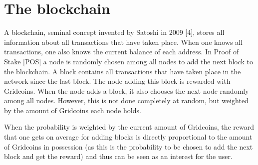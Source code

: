 \section{The blockchain}

A blockchain, seminal concept invented by Satoshi in 2009 [4], stores all information about all transactions that have taken place. When one knows all transactions, one also knows the current balance of each address. In Proof of Stake [POS] a node is randomly chosen among all nodes to add the next block to the blockchain. A block contains all transactions that have taken place in the network since the last block. The node adding this block is rewarded with Gridcoins. When the node adds a block, it also chooses the next node randomly among all nodes. However, this is not done completely at random, but weighted by the amount of Gridcoins each node holds.

When the probability is weighted by the current amount of Gridcoins, the reward that one gets on average for adding blocks is directly proportional to the amount of Gridcoins in possession (as this is the probability to be chosen to add the next block and get the reward) and thus can be seen as an interest for the user.
